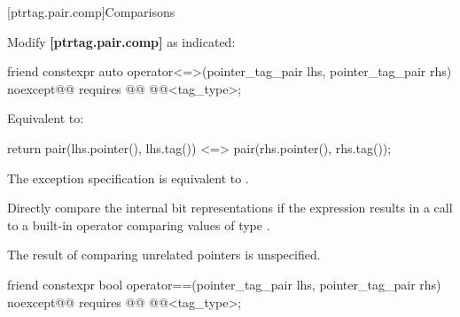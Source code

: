 \documentclass{wg21}
\newcommand{\editinstr}[1]{\textcolor{noteclr}{#1}}
\begin{document}
[ptrtag.pair.comp]{Comparisons}

\editinstr{Modify \textbf{[ptrtag.pair.comp]} as indicated:}

%
\begin{itemdecl}
friend constexpr auto operator<=>(pointer_tag_pair lhs, pointer_tag_pair rhs)
  noexcept@@ requires @@ @@<tag_type>;
\end{itemdecl}

\begin{itemdescr}
\pnum
\effects
Equivalent to:
\begin{codeblock}
return pair(lhs.pointer(), lhs.tag()) <=> pair(rhs.pointer(), rhs.tag());
\end{codeblock}

\begin{addedblock}
\pnum
\remarks
The exception specification is equivalent to
.
\end{addedblock}

\pnum
\recommended
Directly compare the internal bit representations
if the expression 
results in a call to a built-in operator \tcode{<=>}
comparing values of type .

\pnum
\begin{note}
The result of comparing unrelated pointers is unspecified.
\end{note}
\end{itemdescr}

%
\begin{itemdecl}
friend constexpr bool operator==(pointer_tag_pair lhs, pointer_tag_pair rhs)
  noexcept@@ requires @@ @@<tag_type>;
\end{itemdecl}
\end{document}
